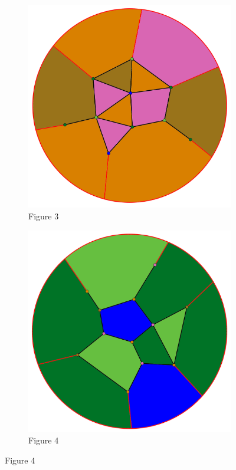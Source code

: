 \documentclass{article}
\begin{document}
\begin{enumerate}
{\begin{figure}[!ht]
\begin{subfigure}[b]{0.45\textwidth} 
\includegraphics[width=\textwidth]{four_colour_3.png}
\caption{Figure 3}
\end{subfigure}
%
\begin{subfigure}[b]{0.45\textwidth}
\includegraphics[width=\textwidth]{four_colour_4.png}
\caption{Figure 4}
\end{subfigure}


\end{figure}}
\end{enumerate}
\end{document}
